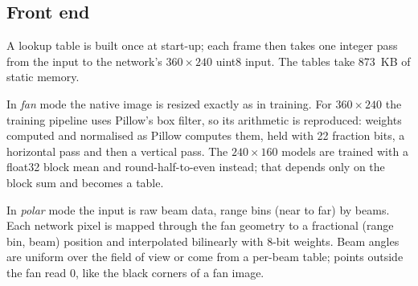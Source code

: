 \documentclass[11pt,a4paper]{article}
\begin{document}
\noindent{}

\subsection{Front end}

A lookup table is built once at start-up; each frame then takes one
integer pass from the input to the network's $360 \times 240$ uint8
input. The tables take 873~KB of static memory.

In \emph{fan} mode the native image is resized exactly as in training.
For $360 \times 240$ the training pipeline uses Pillow's box filter, so
its arithmetic is reproduced: weights computed and normalised as Pillow
computes them, held with 22 fraction bits, a horizontal pass and then a
vertical pass. The $240 \times 160$ models are trained with a float32
block mean and round-half-to-even instead; that depends only on the block
sum and becomes a table.

In \emph{polar} mode the input is raw beam data, range bins (near to far)
by beams. Each network pixel is mapped through the fan geometry to a
fractional (range bin, beam) position and interpolated bilinearly with
8-bit weights. Beam angles are uniform over the field of view or come
from a per-beam table; points outside the fan read 0, like the black
corners of a fan image.
\end{document}
